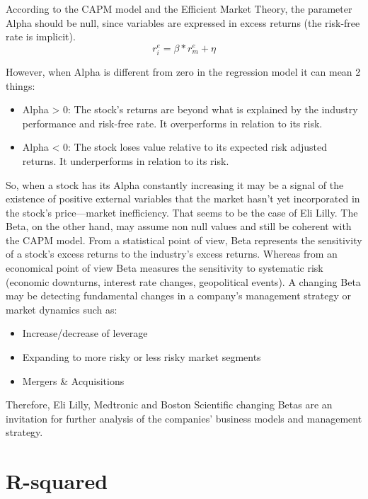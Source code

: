 According to the CAPM model and the Efficient Market Theory, the parameter Alpha should be null, since variables are expressed
in excess returns (the risk-free rate is implicit).
\begin{equation}
    r^{e}_{i} = \beta * r^{e}_{m} + \eta
\end{equation}\label{equation:CAPM}

However, when Alpha is different from zero in the regression model it can mean 2 things:
\begin{itemize}
    \item Alpha > 0: The stock's returns are beyond what is explained by the industry performance and risk-free rate. 
    It overperforms in relation to its risk.
    \item Alpha < 0: The stock loses value relative to its expected risk adjusted returns. 
    It underperforms in relation to its risk.
\end{itemize}

So, when a stock has its Alpha constantly increasing it may be a signal of the existence of positive external variables that
the market hasn't yet incorporated in the stock's price—market inefficiency. That seems to be the case of Eli Lilly.
The Beta, on the other hand, may assume non null values and still be coherent with the CAPM model. 
From a statistical point of view, Beta represents the sensitivity of a stock's excess returns to the industry's excess returns.
Whereas from an economical point of view Beta measures the sensitivity to systematic risk (economic downturns, interest rate 
changes, geopolitical events).
A changing Beta may be detecting fundamental changes in a company's management strategy or market dynamics such as:
\begin{itemize}
    \item Increase/decrease of leverage
    \item Expanding to more risky or less risky market segments
    \item Mergers \& Acquisitions
\end{itemize}

Therefore, Eli Lilly, Medtronic and Boston Scientific changing Betas are an invitation for further analysis of the companies' 
business models and management strategy.

\section{R-squared}

